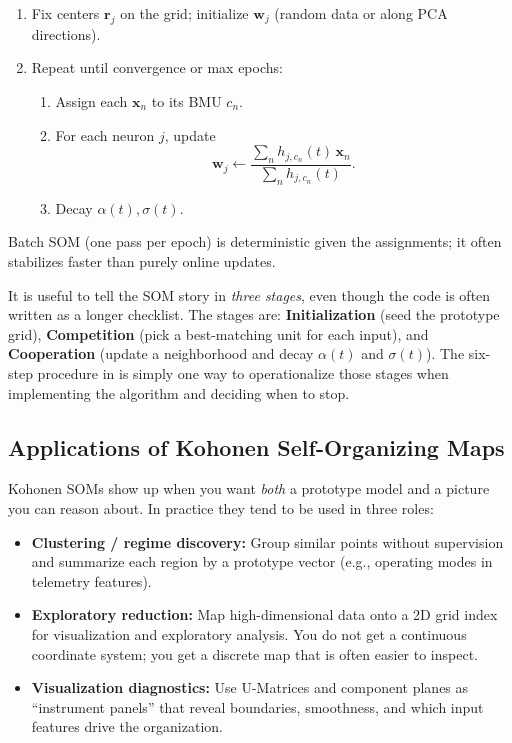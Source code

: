 \begin{tcolorbox}[summarybox, title={Batch SOM (deterministic pass)}]
\begin{enumerate}
    \item Fix centers \(\mathbf{r}_j\) on the grid; initialize \(\mathbf{w}_j\) (random data or along PCA directions).
    \item Repeat until convergence or max epochs:
    \begin{enumerate}
        \item Assign each \(\mathbf{x}_n\) to its BMU \(c_n\).
        \item For each neuron \(j\), update
        \[
        \mathbf{w}_j \leftarrow \frac{\sum_n h_{j, c_n}(t)\,\mathbf{x}_n}{\sum_n h_{j, c_n}(t)}.
        \]
        \item Decay \(\alpha(t),\sigma(t)\).
    \end{enumerate}
\end{enumerate}
Batch SOM (one pass per epoch) is deterministic given the assignments; it often stabilizes faster than purely online updates.
\end{tcolorbox}

\noindent It is useful to tell the SOM story in \emph{three stages}, even though the code is often written as a longer checklist. The stages are: \textbf{Initialization} (seed the prototype grid), \textbf{Competition} (pick a best-matching unit for each input), and \textbf{Cooperation} (update a neighborhood and decay \(\alpha(t)\) and \(\sigma(t)\)). The six-step procedure in  is simply one way to operationalize those stages when implementing the algorithm and deciding when to stop.

\subsection{Applications of Kohonen Self-Organizing Maps}
\label{sec:som_applications_of_kohonen_self_organizing_maps}

Kohonen SOMs show up when you want \emph{both} a prototype model and a picture you can reason about. In practice they tend to be used in three roles:

\begin{itemize}
    \item \textbf{Clustering / regime discovery:} Group similar points without supervision and summarize each region by a prototype vector (e.g., operating modes in telemetry features).
    \item \textbf{Exploratory reduction:} Map high-dimensional data onto a 2D grid index for visualization and exploratory analysis. You do not get a continuous coordinate system; you get a discrete map that is often easier to inspect.
    \item \textbf{Visualization diagnostics:} Use U-Matrices and component planes as ``instrument panels'' that reveal boundaries, smoothness, and which input features drive the organization.
\end{itemize}

